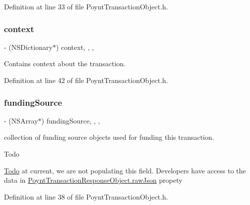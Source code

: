 Definition at line 33 of file Poynt\+Transaction\+Object.\+h.

\hypertarget{interface_poynt_transaction_object_a97674af3143e04f09bbc6590dab812d7}{}\label{interface_poynt_transaction_object_a97674af3143e04f09bbc6590dab812d7} 
\subsubsection{\texorpdfstring{context}{context}}
{\footnotesize\ttfamily -\/ (N\+S\+Dictionary$\ast$) context\hspace{0.3cm}{\ttfamily [read]}, {\ttfamily [write]}, {\ttfamily [nonatomic]}, {\ttfamily [strong]}}

Contains context about the transaction. 

Definition at line 42 of file Poynt\+Transaction\+Object.\+h.

\hypertarget{interface_poynt_transaction_object_ab4cac3360e86d21570d89915c99e6943}{}\label{interface_poynt_transaction_object_ab4cac3360e86d21570d89915c99e6943} 
\subsubsection{\texorpdfstring{funding\+Source}{fundingSource}}
{\footnotesize\ttfamily -\/ (N\+S\+Array$\ast$) funding\+Source\hspace{0.3cm}{\ttfamily [read]}, {\ttfamily [write]}, {\ttfamily [nonatomic]}, {\ttfamily [strong]}}

collection of funding source objects used for funding this transaction. \begin{DoxyRefDesc}{Todo}
\item[\hyperlink{todo__todo000002}{Todo}]at current, we are not populating this field. Developers have access to the data in \hyperlink{interface_poynt_transaction_response_object_a0046f618ca04fd1e7fcf91b87190a944}{Poynt\+Transaction\+Response\+Object.\+raw\+Json} propety \end{DoxyRefDesc}


Definition at line 38 of file Poynt\+Transaction\+Object.\+h.

\hypertarget{interface_poynt_transaction_object_af3bd537ec19ed3fac0b5aa56812a1577}{}\label{interface_poynt_transaction_object_af3bd537ec19ed3fac0b5aa56812a1577} 
